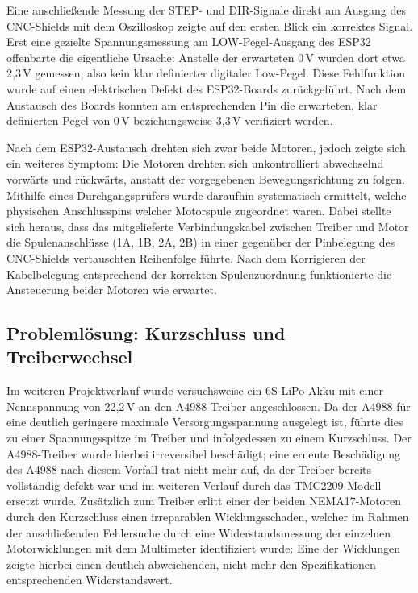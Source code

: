 \documentclass[12pt,ngerman,numbers=noenddot,abstracton,headsepline]{scrreprt}
\begin{document}
Eine anschließende Messung der STEP- und DIR-Signale direkt am Ausgang des CNC-Shields mit dem Oszilloskop zeigte auf den ersten Blick ein korrektes Signal. Erst eine gezielte Spannungsmessung am LOW-Pegel-Ausgang des ESP32 offenbarte die eigentliche Ursache: Anstelle der erwarteten 0\,V wurden dort etwa 2,3\,V gemessen, also kein klar definierter digitaler Low-Pegel. Diese Fehlfunktion wurde auf einen elektrischen Defekt des ESP32-Boards zurückgeführt. Nach dem Austausch des Boards konnten am entsprechenden Pin die erwarteten, klar definierten Pegel von 0\,V beziehungsweise 3,3\,V verifiziert werden.

Nach dem ESP32-Austausch drehten sich zwar beide Motoren, jedoch zeigte sich ein weiteres Symptom: Die Motoren drehten sich unkontrolliert abwechselnd vorwärts und rückwärts, anstatt der vorgegebenen Bewegungsrichtung zu folgen. Mithilfe eines Durchgangsprüfers wurde daraufhin systematisch ermittelt, welche physischen Anschlusspins welcher Motorspule zugeordnet waren. Dabei stellte sich heraus, dass das mitgelieferte Verbindungskabel zwischen Treiber und Motor die Spulenanschlüsse (1A, 1B, 2A, 2B) in einer gegenüber der Pinbelegung des CNC-Shields vertauschten Reihenfolge führte. Nach dem Korrigieren der Kabelbelegung entsprechend der korrekten Spulenzuordnung funktionierte die Ansteuerung beider Motoren wie erwartet.

\subsection{Problemlösung: Kurzschluss und Treiberwechsel}
\label{subsec:motor_kurzschluss}

Im weiteren Projektverlauf wurde versuchsweise ein 6S-LiPo-Akku mit einer Nennspannung von 22,2\,V an den A4988-Treiber angeschlossen. Da der A4988 für eine deutlich geringere maximale Versorgungsspannung ausgelegt ist, führte dies zu einer Spannungsspitze im Treiber und infolgedessen zu einem Kurzschluss. Der A4988-Treiber wurde hierbei irreversibel beschädigt; eine erneute Beschädigung des A4988 nach diesem Vorfall trat nicht mehr auf, da der Treiber bereits vollständig defekt war und im weiteren Verlauf durch das TMC2209-Modell ersetzt wurde. Zusätzlich zum Treiber erlitt einer der beiden NEMA17-Motoren durch den Kurzschluss einen irreparablen Wicklungsschaden, welcher im Rahmen der anschließenden Fehlersuche durch eine Widerstandsmessung der einzelnen Motorwicklungen mit dem Multimeter identifiziert wurde: Eine der Wicklungen zeigte hierbei einen deutlich abweichenden, nicht mehr den Spezifikationen entsprechenden Widerstandswert.
\end{document}
